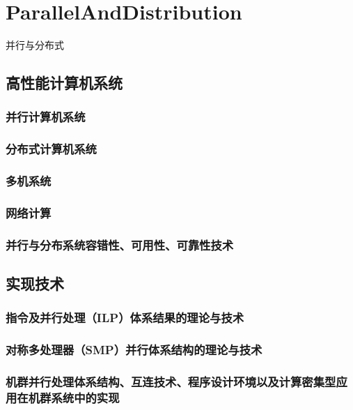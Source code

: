 



\chapter{ParallelAndDistribution}

并行与分布式




\section{高性能计算机系统}

\subsection{并行计算机系统}
\subsection{分布式计算机系统}
\subsection{多机系统}
\subsection{网络计算}
\subsection{并行与分布系统容错性、可用性、可靠性技术}




\section{实现技术}
\subsection{指令及并行处理（ILP）体系结果的理论与技术}
\subsection{对称多处理器（SMP）并行体系结构的理论与技术}
\subsection{机群并行处理体系结构、互连技术、程序设计环境以及计算密集型应用在机群系统中的实现}
